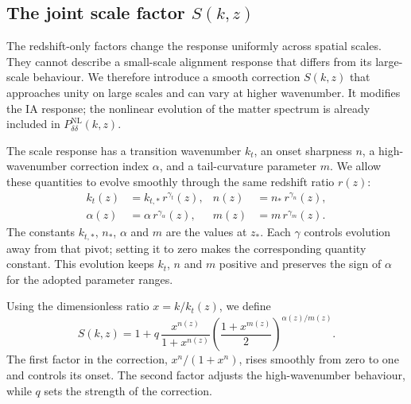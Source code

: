 \subsection{The joint scale factor \texorpdfstring{$S(k,z)$}{S(k,z)}}
\label{sec:scale-factor}

The redshift-only factors change the response uniformly across spatial
scales. They cannot describe a small-scale alignment response that differs
from its large-scale behaviour. We therefore introduce a smooth correction
$S(k,z)$ that approaches unity on large scales and can vary at higher
wavenumber. It modifies the IA response; the nonlinear evolution of the
matter spectrum is already included in $P_{\delta\delta}^{\mathrm{NL}}(k,z)$.

The scale response has a transition wavenumber $k_t$, an onset sharpness
$n$, a high-wavenumber correction index $\alpha$, and a tail-curvature
parameter $m$.
We allow these quantities to evolve smoothly through the same redshift
ratio $r(z)$:
\begin{equation}
  \begin{aligned}
    k_t(z)&=k_{t,*}\,r^{\gamma_t}(z),&
    n(z)&=n_*\,r^{\gamma_n}(z),\\
    \alpha(z)&=\alpha\,r^{\gamma_\alpha}(z),&
    m(z)&=m\,r^{\gamma_m}(z).
  \end{aligned}
  \label{eq:scale-parameter-evolution}
\end{equation}
The constants $k_{t,*}$, $n_*$, $\alpha$ and $m$ are the values at
$z_*$. Each $\gamma$ controls evolution away from that pivot; setting it
to zero makes the corresponding quantity constant. This evolution keeps
$k_t$, $n$ and $m$ positive and preserves the sign of $\alpha$ for the
adopted parameter ranges.

Using the dimensionless ratio $x=k/k_t(z)$, we define
\begin{equation}
  S(k,z)=1+q\,
  \frac{x^{n(z)}}{1+x^{n(z)}}
  \left(\frac{1+x^{m(z)}}{2}\right)^{\alpha(z)/m(z)}.
  \label{eq:scale-response}
\end{equation}
The first factor in the correction, $x^n/(1+x^n)$, rises smoothly from
zero to one and controls its onset. The second factor adjusts the
high-wavenumber behaviour, while $q$ sets the strength of the correction.

